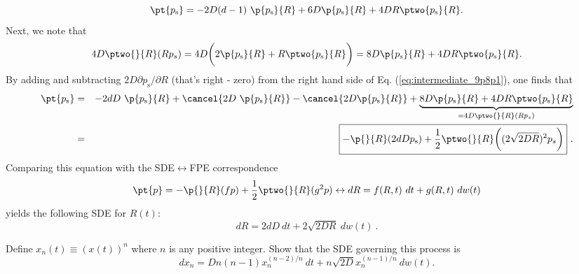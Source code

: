\begin{equation}
\pt{p_\text{s}} 
= - 2D(d-1) ~ \p{p_\text{s} }{R}  + 6 D \p{p_\text{s} }{ R} +  4 D R \ptwo{p_\text{s}}{R} . \label{eq:intermediate_9p8p1}
\end{equation}
Next, we note that
\begin{equation}
4 D  \ptwo{}{R} (R p_s) = 4 D \bigg( 2 \p{p_\text{s} }{R} + R \ptwo{p_\text{s}}{R} \bigg) = 8 D \p{p_\text{s}}{R} + 4D R \ptwo{p_\text{s}}{R}.
\end{equation}
By adding and subtracting $2D \partial p_\text{s} /\partial{R}$ (that's right - zero) from the right hand side of Eq. (\ref{eq:intermediate_9p8p1}), one finds that
\begin{eqnarray}
\pt{p_\text{s}} 
&=& - 2dD ~ \p{p_\text{s}}{R} + \cancel{2D ~ \p{p_\text{s}}{R}} - \cancel{2 D \p{p_\text{s}}{R}} + \underbrace{8 D \p{p_\text{s}}{R} +  4 D R \ptwo{p_\text{s}}{R}}_{=4 D \ptwo{}{R}(R p_s)} \nonumber \\
&=& \boxed{- \p{}{R} (2dDp_\text{s}) + \frac{1}{2} \ptwo{}{R} \bigg((2\sqrt{2DR})^2 p_s\bigg)}~.
\end{eqnarray}
Comparing this equation with the SDE$\leftrightarrow$FPE correspondence
\begin{equation}
\pt{p} = - \p{}{R}(fp) + \frac{1}{2} \ptwo{}{R} (g^2 p) \leftrightarrow d R = f(R, t)~dt + g(R, t)~d w(t)
\end{equation}
yields the following SDE for $R(t)$:
\begin{equation}
\boxed{dR = 2d D~dt + 2\sqrt{2DR} ~ dw(t)}~.
\end{equation}


Define $x_n(t) \equiv (x(t))^{n}$ where $n$ is any positive integer. Show that the SDE governing this process is
\begin{equation}
d x_n = D n(n-1) x_n^{(n-2)/n} ~ dt + n \sqrt{2D}  x_n^{(n-1)/n} ~ dw(t).
\end{equation}

